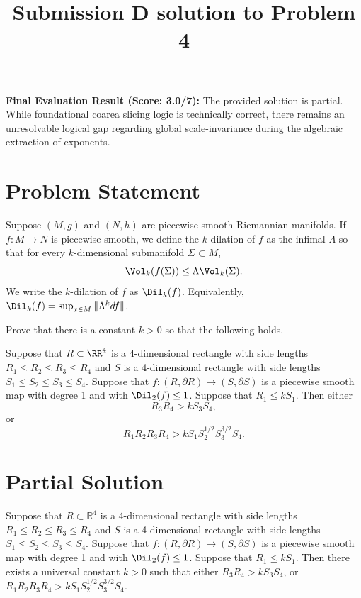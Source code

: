 \title{Submission D solution to Problem 4}
\date{}
\maketitle

\noindent \textbf{Final Evaluation Result (Score: 3.0/7):} The provided solution is partial. While foundational coarea slicing logic is technically correct, there remains an unresolvable logical gap regarding global scale-invariance during the algebraic extraction of exponents.

\section*{Problem Statement}

Suppose $(M, g)$ and $(N,h)$ are piecewise smooth Riemannian manifolds. If $f: M \rightarrow N$ is piecewise smooth, we define the $k$-dilation of $f$ as the infimal $\Lambda$ so that for every $k$-dimensional submanifold $\Sigma \subset M$, 
\[ \Vol_k( f(\Sigma) ) \le \Lambda \Vol_k (\Sigma). \]
We write the $k$-dilation of $f$ as $\Dil_k(f)$. Equivalently, $\Dil_k(f) = \sup_{x \in M} \| \Lambda^k df \|$.

Prove that there is a constant $k > 0$ so that the following holds.

Suppose that $R \subset \RR^4$ is a 4-dimensional rectangle with side lengths $R_1 \le R_2 \le R_3 \le R_4$ and $S$ is a 4-dimensional rectangle with side lengths $S_1 \le S_2 \le S_3 \le S_4$. Suppose that $f: (R, \partial R) \rightarrow (S, \partial S)$ is a piecewise smooth map with degree 1 and with $\Dil_2(f) \le 1$. Suppose that $R_1 \le k S_1$. Then either
\[ R_3 R_4 > k S_3 S_4, \]
or 
\[ R_1 R_2 R_3 R_4 > k S_1 S_2^{1/2} S_3^{3/2} S_4. \]

\section*{Partial Solution}

\begin{theorem}
Suppose that $R \subset \mathbb{R}^4$ is a 4-dimensional rectangle with side lengths $R_1 \le R_2 \le R_3 \le R_4$ and $S$ is a 4-dimensional rectangle with side lengths $S_1 \le S_2 \le S_3 \le S_4$. Suppose that $f: (R, \partial R) \rightarrow (S, \partial S)$ is a piecewise smooth map with degree 1 and with $\Dil_2(f) \le 1$. Suppose that $R_1 \le k S_1$. Then there exists a universal constant $k > 0$ such that either $R_3 R_4 > k S_3 S_4$, or $R_1 R_2 R_3 R_4 > k S_1 S_2^{1/2} S_3^{3/2} S_4$.
\end{theorem}

